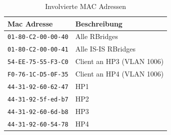 \begin{table}[H]
	\centering
	\begin{tabu} to \linewidth {l l}
		\toprule
		Mac Adresse & Beschreibung \\
		\midrule
		\lstinline|01-80-C2-00-00-40| & Alle RBridges \\
		\lstinline|01-80-C2-00-00-41| & Alle IS-IS RBridges \\
		\lstinline|54-EE-75-55-F3-C0| & Client an HP3 (VLAN 1006) \\
		\lstinline|F0-76-1C-D5-0F-35| & Client an HP4 (VLAN 1006) \\
		\lstinline|44-31-92-60-62-47| & HP1 \\
		\lstinline|44-31-92-5f-ed-b7| & HP2 \\
		\lstinline|44-31-92-60-6d-b8| & HP3 \\
		\lstinline|44-31-92-60-54-78| & HP4 \\
		\bottomrule
	\end{tabu}
	\label{tbl:Lab devices}
	\caption{Involvierte MAC Adressen}
\end{table}

\clearpage
